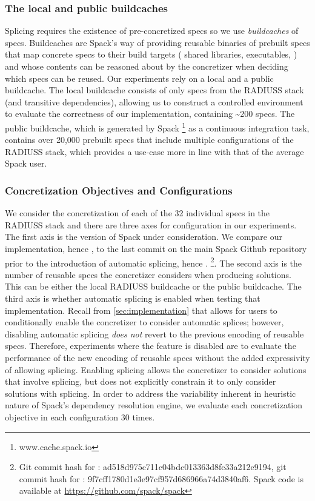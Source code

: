 \subsubsection{The local and public buildcaches}
Splicing requires the existence of pre-concretized specs so we use
\textit{buildcaches} of specs.  Buildcaches are Spack's way of providing
reusable binaries of prebuilt specs that map concrete specs to their build
targets (\eg{} shared libraries, executables, \etc{}) and whose contents can be
reasoned about by the concretizer when deciding which specs can be reused. Our
experiments rely on a local and a public buildcache. The local buildcache
consists of only specs from the RADIUSS stack (and transitive dependencies),
allowing us to construct a controlled environment to evaluate the correctness of
our implementation, containing \textasciitilde{}200 specs. The public buildcache, which is
generated by Spack \footnote{www.cache.spack.io} as a continuous integration
task, contains over 20,000 prebuilt specs that include multiple configurations
of the RADIUSS stack, which provides a use-case more in line with that of
the average Spack user.

\subsubsection{Concretization Objectives and Configurations}
We consider the concretization of each of the 32 individual specs in the RADIUSS
stack and there are three axes for configuration in our experiments. The first
axis is the version of Spack under consideration. We compare our implementation,
hence \splicespack{}, to the last commit on the main Spack Github repository
prior to the introduction of automatic splicing, hence
\oldspack{}. \footnote{Git commit hash for \oldspack{}:
  ad518d975c711c04bdc013363d8fc33a212e9194, git commit hash for \splicespack{}:
  9f7cff1780d1e3e97cf957d686966a74d3840af6. Spack code is available at
  \url{https://github.com/spack/spack}}. The second axis is the number of
reusable specs the concretizer considers when producing solutions. This can be
either the local RADIUSS buildcache or the public buildcache. The third axis is
whether automatic splicing is enabled when testing that implementation. Recall
from \cref{sec:implementation} that \splicespack{} allows for users to
conditionally enable the concretizer to consider automatic splices; however,
disabling automatic splicing \textit{does not} revert to the previous encoding
of reusable specs. Therefore, experiments where the feature is disabled are to
evaluate the performance of the new encoding of reusable specs without the added
expressivity of allowing splicing. Enabling splicing allows the concretizer to
consider solutions that involve splicing, but does not explicitly constrain it
to only consider solutions with splicing. In order to address the variability
inherent in heuristic nature of Spack's dependency resolution engine, we
evaluate each concretization objective in each configuration 30 times.

